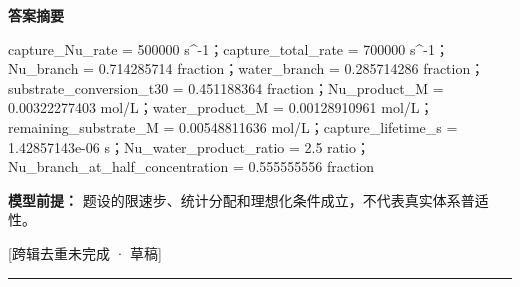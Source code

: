 \documentclass[UTF8,11pt,a4paper]{ctexart}
\begin{document}
\noindent\textbf{答案摘要}\par
capture\_Nu\_rate = 500000 s\textasciicircum{}-1；capture\_total\_rate = 700000 s\textasciicircum{}-1；Nu\_branch = 0.714285714 fraction；water\_branch = 0.285714286 fraction；substrate\_conversion\_t30 = 0.451188364 fraction；Nu\_product\_M = 0.00322277403 mol/L；water\_product\_M = 0.00128910961 mol/L；remaining\_substrate\_M = 0.00548811636 mol/L；capture\_lifetime\_s = 1.42857143e-06 s；Nu\_water\_product\_ratio = 2.5 ratio；Nu\_branch\_at\_half\_concentration = 0.555555556 fraction\par
\noindent\textbf{模型前提：}
题设的限速步、统计分配和理想化条件成立，不代表真实体系普适性。\par
\noindent\textcolor{red!65!black}{[跨辑去重未完成 · 草稿]} \par
\medskip\hrule\medskip
{}
\end{document}
